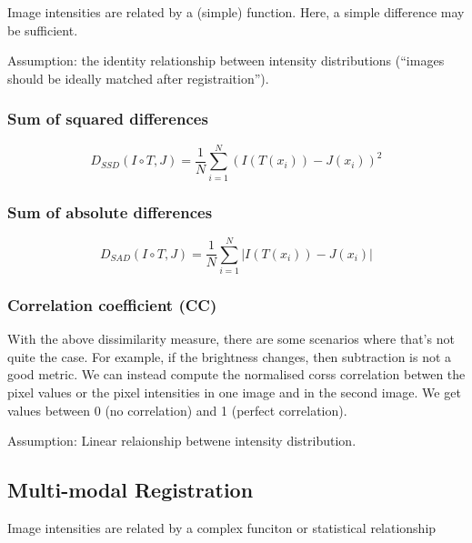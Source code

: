 \documentclass[11pt]{article}
\begin{document}
Image intensities are related by a (simple) function. Here, a simple difference may be sufficient.

Assumption: the identity relationship between intensity distributions (``images should be ideally matched after registraition'').  

\subsubsection{Sum of squared differences}

\begin{equation}
    D_{SSD}(I \circ T,J) = \frac 1 N  \sum^N_{i=1} (I(T(x_i))-J(x_i))^2
\end{equation}

\subsubsection{Sum of absolute differences}

\begin{equation}
    D_{SAD}(I \circ T,J) = \frac 1 N  \sum^N_{i=1} |I(T(x_i))-J(x_i)|
\end{equation}

\subsubsection{Correlation coefficient (CC)}

With the above dissimilarity measure, there are some scenarios where that's not quite the case. For example, if the brightness changes, then subtraction is not a good metric. We can instead compute the normalised corss correlation betwen the pixel values or the pixel intensities in one image and in the second image. We get values between 0 (no correlation) and 1 (perfect correlation).

\begin{figure}[H]
    \centering
\end{figure}

Assumption: Linear relaionship betwene intensity distribution.

\subsection{Multi-modal Registration}

Image intensities are related by a complex funciton or statistical relationship
\end{document}
